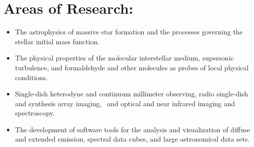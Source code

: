 \section*{Areas of Research: }
\begin{itemize}
    \item The astrophysics of massive star formation and the processes
        governing the stellar initial mass function.
    \item The physical properties of the molecular interstellar medium,
        supersonic turbulence, and formaldehyde and other molecules as probes
        of local physical conditions. 
    \item Single-dish heterodyne and continuum millimeter observing, radio
        single-dish and synthesis array  imaging,  and optical and near
        infrared imaging and spectroscopy. 
    \item The development of software tools for the analysis and visualization
        of diffuse and extended emission, spectral data cubes, and large
        astronomical data sets.
\end{itemize}

